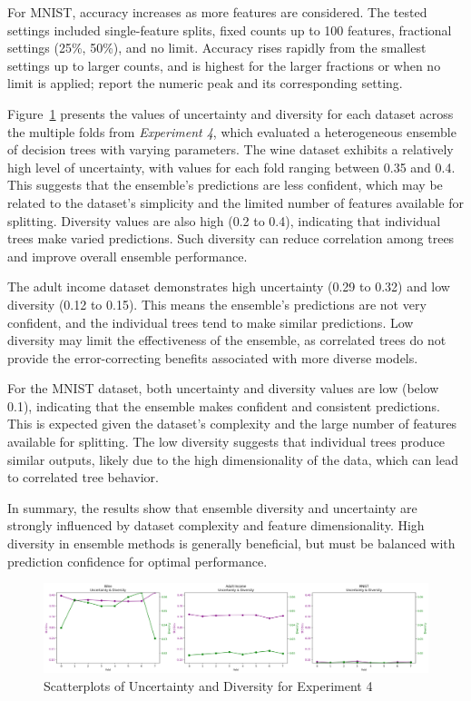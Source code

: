 \documentclass[conference]{IEEEtran}
\begin{document}
For MNIST, accuracy increases as more features are considered. The tested settings included single-feature splits, fixed counts up to 100 features, fractional settings (25\%, 50\%), and no limit. Accuracy rises rapidly from the smallest settings up to larger counts, and is highest for the larger fractions or when no limit is applied; report the numeric peak and its corresponding setting.

Figure~\ref{fig:uncertainty_diversity} presents the values of uncertainty and diversity for each dataset across the multiple folds from \textit{Experiment 4}, which evaluated a heterogeneous ensemble of decision trees with varying parameters. The wine dataset exhibits a relatively high level of uncertainty, with values for each fold ranging between 0.35 and 0.4. This suggests that the ensemble's predictions are less confident, which may be related to the dataset's simplicity and the limited number of features available for splitting. Diversity values are also high (0.2 to 0.4), indicating that individual trees make varied predictions. Such diversity can reduce correlation among trees and improve overall ensemble performance.

The adult income dataset demonstrates high uncertainty (0.29 to 0.32) and low diversity (0.12 to 0.15). This means the ensemble's predictions are not very confident, and the individual trees tend to make similar predictions. Low diversity may limit the effectiveness of the ensemble, as correlated trees do not provide the error-correcting benefits associated with more diverse models.

For the MNIST dataset, both uncertainty and diversity values are low (below 0.1), indicating that the ensemble makes confident and consistent predictions. This is expected given the dataset's complexity and the large number of features available for splitting. The low diversity suggests that individual trees produce similar outputs, likely due to the high dimensionality of the data, which can lead to correlated tree behavior.

In summary, the results show that ensemble diversity and uncertainty are strongly influenced by dataset complexity and feature dimensionality. High diversity in ensemble methods is generally beneficial, but must be balanced with prediction confidence for optimal performance.
\begin{figure}[htbp]
    \centering
    \includegraphics[width=\textwidth]{figures/uncertainty_diversity.png}
    \caption{Scatterplots of Uncertainty and Diversity for Experiment 4}
    \label{fig:uncertainty_diversity}
\end{figure}
\end{document}

